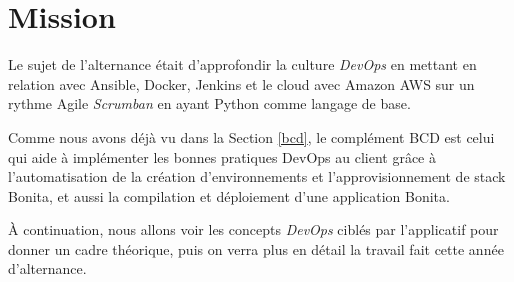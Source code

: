\section{Mission}
Le sujet de l'alternance était d'approfondir la culture \emph{DevOps} en mettant en relation avec Ansible, Docker, Jenkins et le cloud avec Amazon AWS sur un rythme Agile \textit{Scrumban} en ayant Python comme langage de base.

Comme nous avons déjà vu dans la Section \ref{bcd}, le complément BCD est celui qui aide à implémenter les bonnes pratiques DevOps au client grâce à l'automatisation de la création d'environnements et l'approvisionnement de stack Bonita, et aussi la compilation et déploiement d'une application Bonita.

À continuation, nous allons voir les concepts \emph{DevOps} ciblés par l'applicatif pour donner un cadre théorique, puis on verra plus en détail la travail fait cette année d'alternance.














